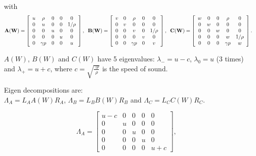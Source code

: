 \documentclass{article}
\begin{document}
with
\begin{equation}
  \mathbf{A(W)} = \left[
    \begin{array}{c c c c c}
      u & \rho     & 0 & 0 & 0 \\
      0 & u        & 0 & 0 & 1/\rho\\
      0 & 0        & u & 0 & 0 \\
      0 & 0        & 0 & u & 0 \\
      0 & \gamma p & 0 & 0 & u \\
    \end{array}
  \right],
  \;\;
  \mathbf{B(W)} = \left[
    \begin{array}{c c c c c}
      v & 0 & \rho     & 0 & 0 \\
      0 & v & 0        & 0 & 0\\
      0 & 0 & v        & 0 & 1/\rho \\
      0 & 0 & 0        & v & 0 \\
      0 & 0 & \gamma p & 0 & v \\
    \end{array}
  \right],
  \;\;
  \mathbf{C(W)} = \left[
    \begin{array}{c c c c c}
      w & 0 & 0 & \rho     & 0 \\
      0 & w & 0 & 0        & 0\\
      0 & 0 & w & 0        & 0 \\
      0 & 0 & 0 & w        & 1/\rho \\
      0 & 0 & 0 & \gamma p & w \\
    \end{array}
  \right].
\end{equation}

$A(W)$, $B(W)$ and $C(W)$ have 5 eigenvalues: $\lambda_{-}=u-c$, $\lambda_{0}=u$ (3 times) and $\lambda_{+}=u+c$, where $c=\sqrt{\frac{\gamma p}{\rho}}$ is the speed of sound.

Eigen decompositions are:\\
$\Lambda_A = L_A A(W) R_A$, $\Lambda_B = L_B B(W) R_B$ and $\Lambda_C = L_C C(W) R_C$.


\begin{equation}
  \Lambda_A = \left[
    \begin{array}{ccccc}
      u-c& 0 & 0 & 0 & 0\\
      0  & u & 0 & 0 & 0\\
      0  & 0 & u & 0 & 0\\
      0  & 0 & 0 & u & 0\\
      0  & 0 & 0 & 0 & u+c
    \end{array}
  \right],\;\;
\end{equation}
\end{document}
